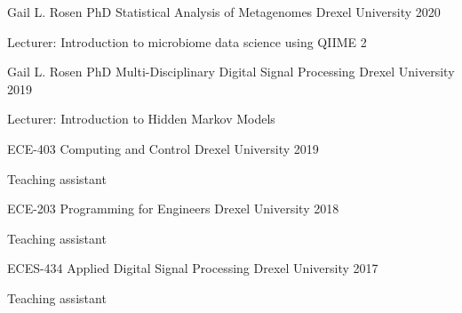 



\begin{cventries}

\cventry
    {Gail L. Rosen PhD}
    {Statistical Analysis of Metagenomes}
    {Drexel University}
    {2020}
    {\begin{cvitems}
        \item Lecturer: Introduction to microbiome data science using QIIME 2
    \end{cvitems}}
    
\cventry
    {Gail L. Rosen PhD}
    {Multi-Disciplinary Digital Signal Processing}
    {Drexel University}
    {2019}
    {\begin{cvitems}
        \item Lecturer: Introduction to Hidden Markov Models
    \end{cvitems}}

\cventry
    {ECE-403}
    {Computing and Control}
    {Drexel University}
    {2019}
    {\begin{cvitems}
        \item Teaching assistant
    \end{cvitems}}
    
\cventry
    {ECE-203}
    {Programming for Engineers}
    {Drexel University}
    {2018}
    {\begin{cvitems}
        \item Teaching assistant
    \end{cvitems}}
    
\cventry
    {ECES-434}
    {Applied Digital Signal Processing}
    {Drexel University}
    {2017}
    {\begin{cvitems}
        \item Teaching assistant
    \end{cvitems}}
    
\end{cventries}


